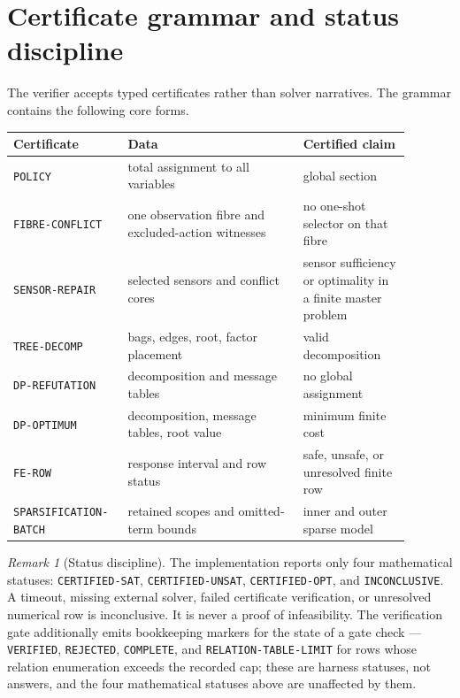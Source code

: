 \documentclass[11pt]{article}
\theoremstyle{plain}
\theoremstyle{definition}
\theoremstyle{remark}
\newtheorem{remark}[theorem]{Remark}
\begin{document}
\section{Certificate grammar and status discipline}
\label{sec:certificates}

The verifier accepts typed certificates rather than solver narratives.  The
grammar contains the following core forms.

\begin{center}
\begin{tabular}{@{}p{0.23\linewidth}p{0.41\linewidth}p{0.25\linewidth}@{}}
\toprule
Certificate & Data & Certified claim\\
\midrule
\texttt{POLICY} & total assignment to all variables & global section\\
\texttt{FIBRE-CONFLICT} & one observation fibre and excluded-action witnesses & no one-shot selector on that fibre\\
\texttt{SENSOR-REPAIR} & selected sensors and conflict cores & sensor sufficiency or optimality in a finite master problem\\
\texttt{TREE-DECOMP} & bags, edges, root, factor placement & valid decomposition\\
\texttt{DP-REFUTATION} & decomposition and message tables & no global assignment\\
\texttt{DP-OPTIMUM} & decomposition, message tables, root value & minimum finite cost\\
\texttt{FE-ROW} & response interval and row status & safe, unsafe, or unresolved finite row\\
\texttt{SPARSIFICATION-\allowbreak BATCH} & retained scopes and omitted-term bounds & inner and outer sparse model\\
\bottomrule
\end{tabular}
\end{center}

\begin{remark}[Status discipline]
\label{rem:status-discipline}
The implementation reports only four mathematical statuses:
\texttt{CERTIFIED-SAT}, \texttt{CERTIFIED-UNSAT}, \texttt{CERTIFIED-OPT}, and
\texttt{INCONCLUSIVE}.  A timeout, missing external solver, failed certificate
verification, or unresolved numerical row is inconclusive.  It is never a proof
of infeasibility.  The verification gate additionally emits bookkeeping
markers for the state of a gate check --- \texttt{VERIFIED},
\texttt{REJECTED}, \texttt{COMPLETE}, and \texttt{RELATION-TABLE-LIMIT} for
rows whose relation enumeration exceeds the recorded cap; these are harness
statuses, not answers, and the four mathematical statuses above are unaffected
by them.
\end{remark}
\end{document}
